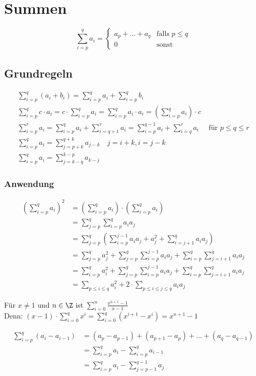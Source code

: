 \section{Summen}
\[ \sum_{i=p}^q a_i = \begin{cases}
	a_p + \dots + a_q	&\text{falls } p \leq q	\\
	0				&\text{sonst}		
\end{cases} \]

\subsection{Grundregeln}
\begin{gather*}
	\sum_{i=p}^q (a_i + b_i) = \sum_{i=p}^q a_i + \sum_{i=p}^q b_i \\
	\sum_{i=p}^q c \cdot a_i = c \cdot \sum_{i=p}^q a_i = \sum_{i=p}^q a_i \cdot a_i = \left( \sum_{i=p}^q a_i \right) \cdot c \\
	\sum_{i=p}^r a_i = \sum_{i=p}^q a_i + \sum_{i=q+1}^r a_i = \sum_{i=p}^{q-1} a_i + \sum_{i=q}^r a_i \quad \text{ für } p \leq q \leq r \\
	\sum_{i=p}^q a_i = \sum_{j=p+k}^{q+k} a_{j-k} \quad j = i+k , i = j-k \\
	\sum_{i=p}^q a_i = \sum_{j=k-q}^{k-p} a_{k-j}
\end{gather*}

\subsubsection{Anwendung}
\[ \begin{split}
	\left( \sum_{i=p}^q a_i \right)^2	&= \left( \sum_{i=p}^q a_i \right) \cdot \left( \sum_{i=p}^q a_i \right) \\
							&= \sum_{j=p}^q \sum_{i=p}^q a_i a_j \\
							&= \sum_{j=p}^q \left( \sum_{i=p}^{j-1} a_i a_j + a_j^2 + \sum_{i=j+1}^q a_i a_j \right) \\
							&= \sum_{j=p}^q a_j^2 + \sum_{j=p}^q \sum_{i=p}^{j-1} a_i a_j + \sum_{i=p}^q \sum_{j=i+1}^q a_i a_j \\
							&= \sum_{i=p}^q a_i^2 + \sum_{j=p}^q \sum_{i=p}^{j-1} a_i a_j + \sum_{i=p}^q \sum_{j=i+1}^q a_i a_j \\
							&= \sum_{p \leq i \leq q} a_i^2 + 2 \cdot \sum_{p \leq i \leq j \leq q} a_i a_j
\end{split} \]
\begin{bsp*}[note = Geometrische Summe]
	Für $x \neq 1$ und $n \in \Z$ ist $\sum_{i=0}^n \frac{x^{n+1} - 1}{x-1}$\\
	Denn: $(x-1) \cdot \sum_{i=0}^q x^i = \sum _{i=0}^q (x^{i+1} - x^i) = x^{n+1} - 1$
\end{bsp*}
\begin{bsp*}[note = Teleskopsumme]
	\[ \begin{split}
		\sum_{i=p}^q (a_i - a_{i-1})	&= (a_p - a_{p-1}) + (a_{p+1} - a_p) + \dots + (a_q - a_{q-1}) \\
							&= \sum_{i=p}^q a_i - \sum_{i=p}^q a_{i-1} \\
							&= \sum_{i=p}^q a_i - \sum_{j=p-1}^{q-1} a_j
	\end{split} \]
\end{bsp*}


